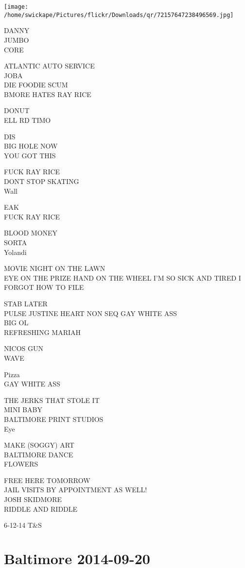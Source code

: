\documentclass[10pt,letterpaper]{article}
\begin{document}
\texttt{[image: /home/swickape/Pictures/flickr/Downloads/qr/72157647238496569.jpg]}
\pagebreak

DANNY\\
JUMBO\\
CORE

ATLANTIC AUTO SERVICE\\
JOBA\\
DIE FOODIE SCUM\\
BMORE HATES RAY RICE

DONUT\\
ELL RD TIMO

DIS\\
BIG HOLE NOW\\
YOU GOT THIS

FUCK RAY RICE\\
DONT STOP SKATING\\
Wall

EAK\\
FUCK RAY RICE

BLOOD MONEY\\
SORTA\\
Yolandi

MOVIE NIGHT ON THE LAWN\\
EYE ON THE PRIZE HAND ON THE WHEEL I'M SO SICK AND TIRED I FORGOT HOW TO FILE

STAB LATER\\
PULSE JUSTINE HEART NON SEQ GAY WHITE ASS\\
BIG OL\\
REFRESHING MARIAH

NICOS GUN\\
WAVE

Pizza\\
GAY WHITE ASS

THE JERKS THAT STOLE IT\\
MINI BABY\\
BALTIMORE PRINT STUDIOS\\
Eye

MAKE (SOGGY) ART\\
BALTIMORE DANCE\\
FLOWERS

FREE HERE TOMORROW\\
JAIL VISITS BY APPOINTMENT AS WELL!\\
JOSH SKIDMORE\\
RIDDLE AND RIDDLE

6{-}12{-}14 T\&S
\pagebreak

\section*{Baltimore 2014-09-20}
\end{document}
